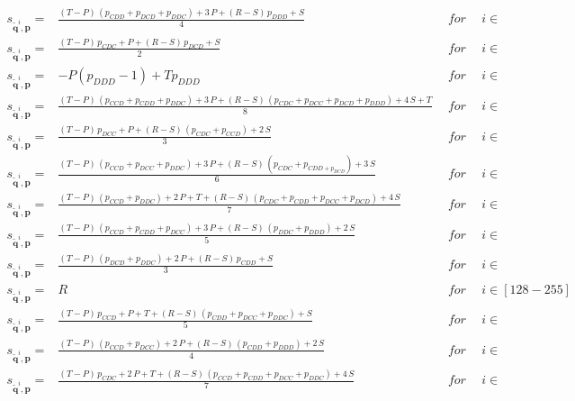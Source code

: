 \documentclass{article}
\theoremstyle{definition}
\begin{document}
\begin{equation*}
  \begin{array}{lcll}
    s_{\mathbf{\tilde{q}}^{i}, \mathbf{p}} = & \frac{ (T - P)\, \left(p_{CDD} + p_{DCD} + p_{DDC}\right) + 3\,P + (R - S)\, p_{DDD} + S}{4} &~~for~~ & i \in \\[0.4cm]
    s_{\mathbf{\tilde{q}}^{i}, \mathbf{p}} = & \frac{ (T - P)\, p_{CDC} + P + (R - S)\, p_{DCD} + S}{2} &~~for~~ & i \in \\ [0.4cm]
    s_{\mathbf{\tilde{q}}^{i}, \mathbf{p}} = &- P \left(p_{DDD} - 1\right) + T p_{DDD} &~~for~~ & i \in \\[0.4cm]
    s_{\mathbf{\tilde{q}}^{i}, \mathbf{p}} = & \frac{ (T - P)\, (p_{CCD} + p_{CDD} + p_{DDC}) + 3\,P + (R - S)\, (p_{CDC} + p_{DCC} + p_{DCD} + p_{DDD}) + 4\,S + T}{8} &~~for~~ & i \in \\[0.4cm]
    s_{\mathbf{\tilde{q}}^{i}, \mathbf{p}} = & \frac{ (T - P)\, p_{DCC} + P + (R - S)\, (p_{CDC} + p_{CCD}) + 2\,S}{3}  &~~for~~ & i \in \\[0.4cm]
    s_{\mathbf{\tilde{q}}^{i}, \mathbf{p}} = & \frac{ (T - P)\, (p_{CCD} + p_{DCC} + p_{DDC}) + 3\,P + (R - S)\, (p_{CDC} + p_{CDD + p_{DCD}}) + 3\,S}{6}  &~~for~~ & i \in \\ [0.4cm]
    s_{\mathbf{\tilde{q}}^{i}, \mathbf{p}} = & \frac{ (T - P)\, (p_{CCD} + p_{DDC}) + 2\,P + T + (R - S)\, (p_{CDC} + p_{CDD} + p_{DCC} + p_{DCD}) + 4\,S}{7}  &~~for~~ & i \in \\ [0.4cm]
    s_{\mathbf{\tilde{q}}^{i}, \mathbf{p}} = & \frac{ (T - P)\, (p_{CCD} + p_{CDD} + p_{DCC}) + 3\,P + (R - S)\, (p_{DDC} + p_{DDD}) + 2\,S}{5}  &~~for~~ & i \in  \\ [0.4cm]
    s_{\mathbf{\tilde{q}}^{i}, \mathbf{p}} = & \frac{ (T - P)\, (p_{DCD} + p_{DDC}) + 2\,P + (R - S)\, p_{CDD} + S}{3}  &~~for~~ & i \in  \\ [0.4cm]
    s_{\mathbf{\tilde{q}}^{i}, \mathbf{p}} = &R &~~for~~ & i \in [128 - 255] \\ [0.4cm]
    s_{\mathbf{\tilde{q}}^{i}, \mathbf{p}} = & \frac{ (T - P)\, p_{CCD} + P + T + (R - S)\, (p_{CDD} + p_{DCC} + p_{DDC}) + S}{5} &~~for~~ & i \in \\ [0.4cm]
    s_{\mathbf{\tilde{q}}^{i}, \mathbf{p}} = & \frac{ (T - P)\, (p_{CCD} + p_{DCC}) + 2\,P + (R - S)\, (p_{CDD} + p_{DDD}) + 2\,S}{4} &~~for~~ & i \in \\ [0.4cm]
    s_{\mathbf{\tilde{q}}^{i}, \mathbf{p}} = & \frac{(T - P)\, p_{CDC} + 2\, P + T + (R - S)\, (p_{CCD} + p_{CDD} + p_{DCC} + p_{DDC}) + 4\,S}{7} &~~for~~ & i \in \\ [0.4cm]

\end{array}
\end{equation*}
\end{document}
